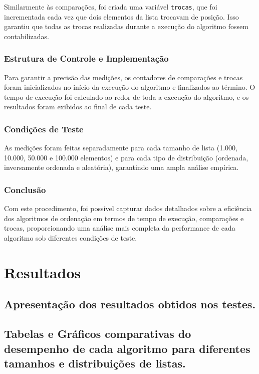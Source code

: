 \documentclass[a4paper,12pt]{article}
\begin{document}
Similarmente às comparações, foi criada uma variável \texttt{trocas}, que foi incrementada cada vez que dois elementos da lista trocavam de posição. Isso garantiu que todas as trocas realizadas durante a execução do algoritmo fossem contabilizadas.

\subsubsection{Estrutura de Controle e Implementação}

Para garantir a precisão das medições, os contadores de comparações e trocas foram inicializados no início da execução do algoritmo e finalizados ao término. O tempo de execução foi calculado ao redor de toda a execução do algoritmo, e os resultados foram exibidos ao final de cada teste.

\subsubsection{Condições de Teste}

As medições foram feitas separadamente para cada tamanho de lista (1.000, 10.000, 50.000 e 100.000 elementos) e para cada tipo de distribuição (ordenada, inversamente ordenada e aleatória), garantindo uma ampla análise empírica.

\subsubsection{Conclusão}
Com este procedimento, foi possível capturar dados detalhados sobre a eficiência dos algoritmos de ordenação em termos de tempo de execução, comparações e trocas, proporcionando uma análise mais completa da performance de cada algoritmo sob diferentes condições de teste.


\section{Resultados}
\subsection{Apresentação dos resultados obtidos nos testes.}
\subsection{Tabelas e Gráficos comparativas do desempenho de cada algoritmo para diferentes tamanhos e distribuições de listas.}
\end{document}
